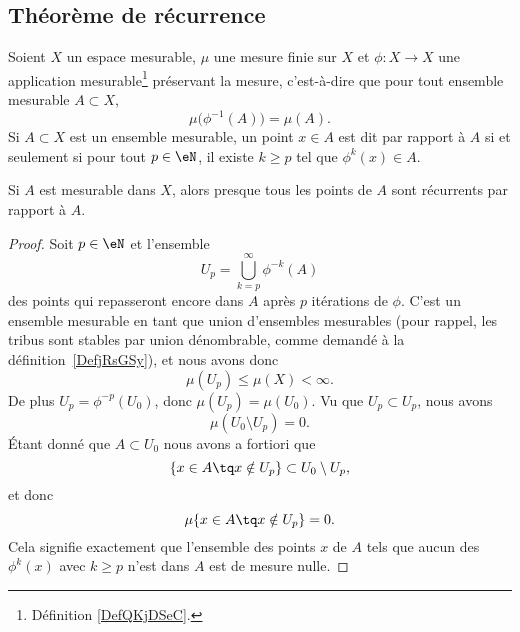\subsection{Théorème de récurrence}

Soient \( X\) un espace mesurable, \( \mu\) une mesure finie sur \( X\) et \( \phi\colon X\to X\) une application mesurable\footnote{Définition \ref{DefQKjDSeC}.} préservant la mesure, c'est-à-dire que pour tout ensemble mesurable \( A\subset X\),
\begin{equation}
    \mu\big( \phi^{-1}(A) \big)=\mu(A).
\end{equation}
Si \( A\subset X\) est un ensemble mesurable, un point \( x\in A\) est dit  par rapport à \( A\) si et seulement si pour tout \( p\in \eN\), il existe \( k\geq p\) tel que \( \phi^k(x)\in A\).

\begin{theorem}     \label{ThoYnLNEL}
    Si \( A\) est mesurable dans \( X\), alors presque tous les points de \( A\) sont récurrents par rapport à \( A\).
\end{theorem}

\begin{proof}
    Soit \( p\in \eN\) et l'ensemble
    \begin{equation}
        U_p=\bigcup_{k=p}^{\infty}\phi^{-k}(A)
    \end{equation}
    des points qui repasseront encore dans \( A\) après \( p\) itérations  de \( \phi\). C'est un ensemble mesurable en tant que union d'ensembles mesurables (pour rappel, les tribus sont stables par union dénombrable, comme demandé à la définition~\ref{DefjRsGSy}), et nous avons donc
    \begin{equation}
        \mu(U_p)\leq \mu(X)<\infty.
    \end{equation}
    De plus \( U_p=\phi^{-p}(U_0)\), donc \( \mu(U_p)=\mu(U_0)\). Vu que \( U_p\subset U_p\), nous avons
    \begin{equation}
        \mu(U_0\setminus U_p)=0.
    \end{equation}
    Étant donné que \( A\subset U_0\) nous avons a fortiori que
    \begin{equation}
        \{ x\in A\tq x\notin U_p \}\subset U_0\setminus U_p,
    \end{equation}
    et donc
    \begin{equation}
        \mu\{ x\in A\tq x\notin U_p \}=0.
    \end{equation}
    Cela signifie exactement que l'ensemble des points \( x\) de \( A\) tels que aucun des \( \phi^k(x)\) avec \( k\geq p\) n'est dans \( A\) est de mesure nulle.
\end{proof}

